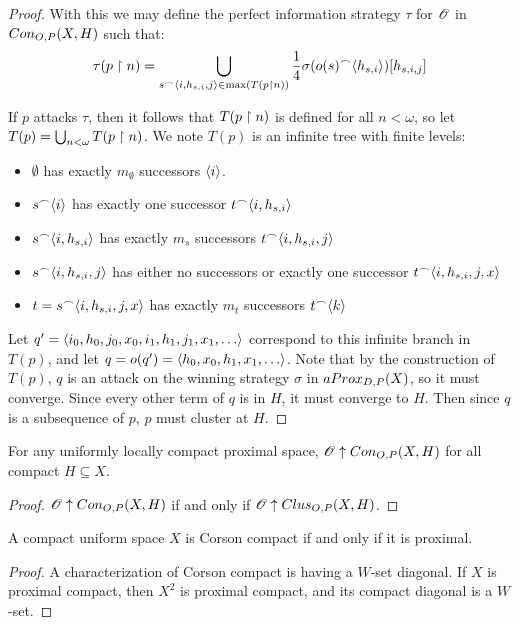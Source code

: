 \begin{proof}
  With this we may define the perfect information strategy $\tau$ for $\mathscr{O}$ in $Con_{O,P}(X,H)$ such that:
  \[
    \tau(p\restriction n) = \bigcup_{s^\frown\langle i,h_{s,i},j\rangle\in\max(T(p\restriction n))} \frac{1}{4}\sigma(o(s)^\frown\langle h_{s,i}\rangle)[h_{s,i,j}]
  \]

  If $p$ attacks $\tau$, then it follows that $T(p\restriction n)$ is defined for all $n<\omega$, so let $T(p)=\bigcup_{n<\omega} T(p\restriction n)$. We note $T(p)$ is an infinite tree with finite levels:
    \begin{itemize}
      \item $\emptyset$ has exactly $m_\emptyset$ successors $\langle i\rangle$.
      \item $s^\frown\langle i\rangle$ has exactly one successor $t^\frown\langle i,h_{s,i}\rangle$
      \item $s^\frown\langle i,h_{s,i}\rangle$ has exactly $m_s$ successors $t^\frown\langle i,h_{s,i},j\rangle$
      \item $s^\frown\langle i,h_{s,i},j\rangle$ has either no successors or exactly one successor $t^\frown\langle i,h_{s,i},j,x\rangle$
      \item $t=s^\frown\langle i,h_{s,i},j,x\rangle$ has exactly $m_t$ successors $t^\frown\langle k\rangle$
    \end{itemize}

  Let $q'=\<i_0,h_0,j_0,x_0,i_1,h_1,j_1,x_1,\dots\>$ correspond to this infinite branch in $T(p)$, and let $q=o(q')=\<h_0,x_0,h_1,x_1,\dots\>$. Note that by the construction of $T(p)$, $q$ is an attack on the winning strategy $\sigma$ in $aProx_{D,P}(X)$, so it must converge. Since every other term of $q$ is in $H$, it must converge to $H$. Then since $q$ is a subsequence of $p$, $p$ must cluster at $H$.
\end{proof}


\begin{corollary}
  For any uniformly locally compact proximal space, $\mathscr{O}\uparrow Con_{O,P}(X,H)$ for all compact $H\subseteq X$.
\end{corollary}

\begin{proof}
  $\mathscr{O} \uparrow Con_{O,P}(X,H)$ if and only if $\mathscr{O} \uparrow Clus_{O,P}(X,H)$.
\end{proof}

\begin{corollary}
  A compact uniform space $X$ is Corson compact if and only if it is proximal.
\end{corollary}

\begin{proof}
  A characterization of Corson compact is having a $W$-set diagonal. If $X$ is proximal compact, then $X^2$ is proximal compact, and its compact diagonal is a $W$-set.
\end{proof}









